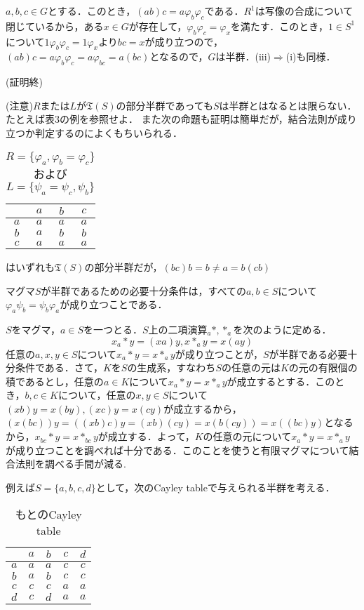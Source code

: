 $a,b,c\in G$とする．このとき，$(ab)c=a\varphi_b\varphi_c$である．$R^1$は写像の合成について閉じているから，ある$x\in G$が存在して，$\varphi_b\varphi_c=\varphi_x$を満たす．このとき，$1\in S^1$について$1\varphi_b\varphi_c=1\varphi_x$より$bc=x$が成り立つので，$(ab)c=a\varphi_b\varphi_c=a\varphi_{bc}=a(bc)$となるので，$G$は半群．(iii)$\Rightarrow$(i)も同様．
\begin{flushright}(証明終)\end{flushright}
(注意)$R$または$L$が${\mathfrak T}(S)$の部分半群であっても$S$は半群とはなるとは限らない．たとえば表3の例を参照せよ．
また次の命題も証明は簡単だが，結合法則が成り立つか判定するのによくもちいられる．
\begin{table}[htb]
\begin{center}
\begin{tabular}{c|ccc}
     &$a$&$b$&$c$ \\ \hline
$a$&$a$&$a$&$a$ \\
$b$&$a$&$b$&$b$ \\
$c$&$a$&$a$&$a$
\end{tabular}
\caption{$R=\{\varphi_a,\varphi_b=\varphi_c\}$および$L=\{\psi_a=\psi_c,\psi_b\}$}はいずれも${\mathfrak T}(S)$の部分半群だが，$(bc)b=b\neq a=b(cb)$
\end{center}
\end{table}
\begin{sprop}
マグマ$S$が半群であるための必要十分条件は，すべての$a,b\in S$について$\varphi_a\psi_b=\psi_b\varphi_a$が成り立つことである．
\end{sprop}
$S$をマグマ，$a\in S$を一つとる．$S$上の二項演算$_{a}*,*_{a}$を次のように定める．
$$
x_{a}*y=(xa)y, x*_{a}y=x(ay)
$$
任意の$a,x,y\in S$について$x_{a}*y=x*_{a}y$が成り立つことが，$S$が半群である必要十分条件である．さて，$K$を$S$の生成系，すなわち$S$の任意の元は$K$の元の有限個の積であるとし，任意の$a\in K$について$x_{a}*y=x*_{a}y$が成立するとする．このとき，$b,c\in K$について，任意の$x,y\in S$について$(xb)y=x(by), (xc)y=x(cy)$が成立するから，$(x(bc))y=((xb)c)y=(xb)(cy)=x(b(cy))=x((bc)y)$となるから，$x_{bc}*y=x*_{bc}y$が成立する．よって，$K$の任意の元について$x_{a}*y=x*_{a}y$が成り立つことを調べれば十分である．このことを使うと有限マグマについて結合法則を調べる手間が減る.
\par
例えば$S=\{a,b,c,d\}$として，次のCayley tableで与えられる半群を考える．
\begin{table}[htb]
\begin{center}
\begin{tabular}{c|cccc}
     &$a$&$b$&$c$&$d$ \\ \hline
$a$&$a$&$a$&$c$&$c$ \\
$b$&$a$&$b$&$c$&$c$ \\
$c$&$c$&$c$&$a$&$a$ \\
$d$&$c$&$d$&$a$&$a$  
\end{tabular}
\caption{もとのCayley table}
\end{center}
\end{table}
